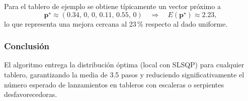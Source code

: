 Para el tablero de ejemplo se obtiene típicamente un vector próximo a
\[
\mathbf{p}^\star \approx (0.34,\,0,\,0,\,0.11,\,0.55,\,0)
\quad\Longrightarrow\quad
E(\mathbf{p}^\star) \approx 2.23,
\]
lo que representa una mejora cercana al 23\,\% respecto al dado uniforme.

\subsubsection{Conclusión}
El algoritmo entrega la distribución óptima (local con SLSQP) para cualquier
tablero, garantizando la media de 3.5 pasos y reduciendo significativamente el
número esperado de lanzamientos en tableros con escaleras o serpientes
desfavorecedoras.
